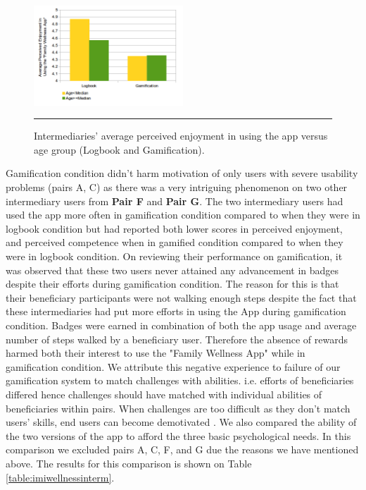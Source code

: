 \documentclass{sig-alternate}
\begin{document}
\begin{figure}[htbp]
  \centering
    \includegraphics[width=0.5\textwidth]{PE_Interm_App_exp_seq.png}
    \rule{26em}{0.5pt}
  \caption{Intermediaries' average perceived enjoyment in using the app versus age group (Logbook and Gamification).}
  \label{figure:PE_Interm_App_exp_seq}
\end{figure}\newline
Gamification condition didn't harm motivation of only users with severe usability problems (pairs A, C) as there was  a very intriguing phenomenon on two other intermediary users from \textbf{Pair F} and \textbf{Pair G}. The two intermediary users had used the app more often in gamification condition  compared to when they were in logbook condition but had reported both lower scores in perceived enjoyment, and perceived competence when in gamified condition compared to when they were in logbook condition. On reviewing their performance on gamification, it was observed that these two users never attained any advancement in badges despite their efforts during gamification condition. The reason for this is that their beneficiary participants were not walking enough steps despite the fact that these intermediaries had put  more efforts in using the App during gamification condition. Badges were earned in combination of both the app usage and average number of steps walked by a beneficiary user. Therefore the absence of rewards harmed both their interest to use the "Family Wellness App" while in gamification condition. We attribute this negative experience to failure of our gamification system to match challenges with abilities. i.e. efforts of beneficiaries differed hence challenges should have matched with individual abilities of beneficiaries within pairs. When challenges are too difficult as they don't match users' skills, end users can become demotivated \cite{zhang2008:motivational}.\newline
We also compared the ability of the two versions of the app to afford the three basic psychological needs. In this comparison we excluded pairs A, C, F, and G due the reasons we have mentioned above. The results for this comparison is shown on Table \ref{table:imiwellnessinterm}.
\end{document}
